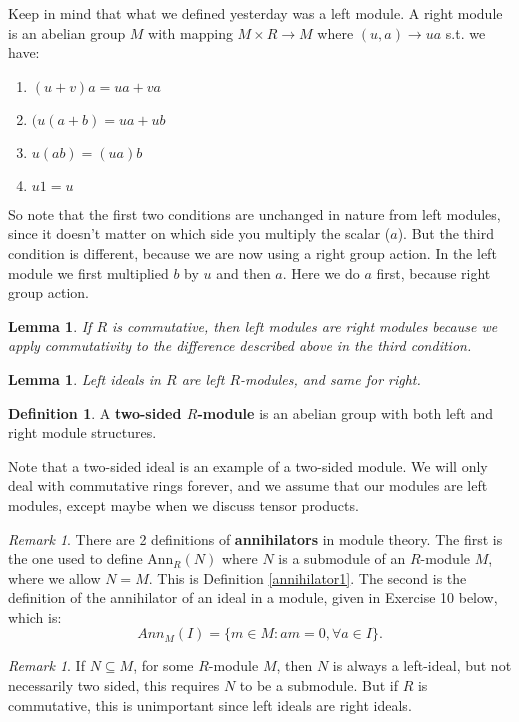 \documentclass[12pt]{amsbook}
\theoremstyle{plain}
\numberwithin{section}{chapter}
\numberwithin{equation}{chapter}
\newtheorem{lem}[theorem]{Lemma}
\theoremstyle{definition}
\newtheorem{Def}[theorem]{Definition}
\theoremstyle{remark}
\newtheorem{rem}[theorem]{Remark}
\newcommand{\sub}{\subseteq}
\begin{document}
Keep in mind that what we defined yesterday was a left module. A right module is an abelian group $M$ with mapping $M \times R \to M$ where $(u,a) \to ua$ s.t. we have:
\begin{enumerate}
\item $(u + v)a = ua + va$
\item $(u(a + b) = ua + ub$
\item $u(ab) = (ua)b$
\item $u1 = u$
\end{enumerate} 
So note that the first two conditions are unchanged in nature from left modules, since it doesn't matter on which side you multiply the scalar ($a$). But the third condition is different, because we are now using a right group action. In the left module we first multiplied $b$ by $u$ and then $a$. Here we do $a$ first, because right group action. 

\begin{lem}
If $R$ is commutative, then left modules are right modules because we apply commutativity to the difference described above in the third condition. 
\end{lem}

\begin{lem}
Left ideals in $R$ are left $R$-modules, and same for right. 
\end{lem}

\begin{Def}
A \textbf{two-sided $R$-module} is an abelian group with both left and right module structures. 
\end{Def}
Note that a two-sided ideal is an example of a two-sided module. We will only deal with commutative rings forever, and we assume that our modules are left modules, except maybe when we discuss tensor products. 

\begin{rem}
There are 2 definitions of \textbf{annihilators} in module theory. The first is the one used to define Ann$_R(N)$ where $N$ is a submodule of an $R$-module $M$, where we allow $N = M$. This is Definition \ref{annihilator1}. The second is the definition of the annihilator of an ideal in a module, given in Exercise 10 below, which is:
$$
Ann_M(I) = \{m \in M: am = 0, \forall a \in I\}.
$$
\end{rem}

\begin{rem}
If $N\sub M$, for some $R$-module $M$, then $N$ is always a left-ideal, but not necessarily two sided, this requires $N$ to be a submodule. But if $R$ is commutative, this is unimportant since left ideals are right ideals. 
\end{rem}
\end{document}
